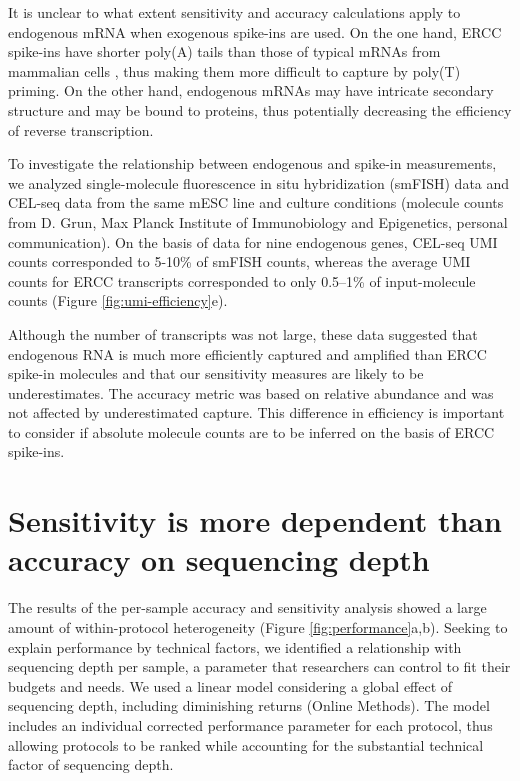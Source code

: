 It is unclear to what extent sensitivity and accuracy calculations apply to endogenous mRNA when exogenous spike-ins are used. On the one hand, ERCC spike-ins have shorter poly(A) tails than those of typical mRNAs from mammalian cells \cite{Viphakone2008-kh}, thus making them more difficult to capture by poly(T) priming. On the other hand, endogenous mRNAs may have intricate secondary structure and may be bound to proteins, thus potentially decreasing the efficiency of reverse transcription.

To investigate the relationship between endogenous and spike-in measurements, we analyzed single-molecule fluorescence in situ hybridization (smFISH) data and CEL-seq data from the same mESC line and culture conditions \cite{Grun2014-fx} (molecule counts from D. Grun, Max Planck Institute of Immunobiology and Epigenetics, personal communication). On the basis of data for nine endogenous genes, CEL-seq UMI counts corresponded to 5-10\% of smFISH counts, whereas the average UMI counts for ERCC transcripts corresponded to only 0.5–1\% of input-molecule counts (Figure \ref{fig:umi-efficiency}e).

Although the number of transcripts was not large, these data suggested that endogenous RNA is much more efficiently captured and amplified than ERCC spike-in molecules and that our sensitivity measures are likely to be underestimates. The accuracy metric was based on relative abundance and was not affected by underestimated capture. This difference in efficiency is important to consider if absolute molecule counts are to be inferred on the basis of ERCC spike-ins.

\section{Sensitivity is more dependent than accuracy on sequencing depth}

The results of the per-sample accuracy and sensitivity analysis showed a large amount of within-protocol heterogeneity (Figure \ref{fig:performance}a,b). Seeking to explain performance by technical factors, we identified a relationship with sequencing depth per sample, a parameter that researchers can control to fit their budgets and needs. We used a linear model considering a global effect of sequencing depth, including diminishing returns (Online Methods). The model includes an individual corrected performance parameter for each protocol, thus allowing protocols to be ranked while accounting for the substantial technical factor of sequencing depth.

